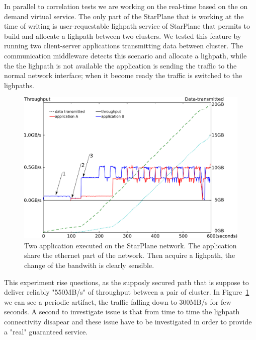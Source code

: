 In parallel to correlation tests we are working on the real-time
based  on the on demand virtual
service. The only part of the StarPlane that is working at the time of
writing is user-requestable lighpath service of StarPlane that permits
to build and allocate a lighpath between two clusters. We tested this
feature by running two client-server applications transmitting data
between cluster. The communication middleware detects this scenario
and allocate a lighpath, while the the lighpath is not available the
application is sending the traffic to the normal network interface;
when it become ready the traffic is switched
 to the lighpaths.
\begin{figure}[h]
  \centering
  \includegraphics[width=\textwidth] {img/timing.eps}
    \caption{\label{fig:timing}
		Two application executed on the StarPlane network. The application share the ethernet part of the network. Then acquire a lighpath, the change of the bandwith is clearly sensible.}
\end{figure} 

This experiment rise questions, as the supposly secured path that is suppose to deliver reliably "550MB/s" of throughput between a pair of cluster. In Figure~\ref{fig:timing} we can see a periodic artifact, the traffic falling down to 300MB/s for few seconds. A second to investigate issue is that from time to time the lighpath connectivity disapear and these issue have to be investigated in order to provide a "real" guaranteed service. 
